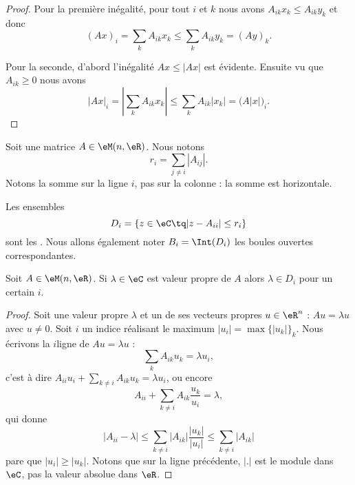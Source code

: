 \begin{proof}
    Pour la première inégalité, pour tout \( i\) et \( k\) nous avons \( A_{ik}x_k\leq A_{ik}y_k\) et donc
    \begin{equation}
        (Ax)_i=\sum_kA_{ik}x_k\leq \sum_kA_{ik}y_k=(Ay)_k.
    \end{equation}
    
    Pour la seconde, d'abord l'inégalité \( Ax\leq | Ax |\) est évidente. Ensuite vu que \( A_{ik}\geq 0\) nous avons
    \begin{equation}
        | Ax |_i=| \sum_kA_{ik}x_k |\leq \sum_kA_{ik}| x_k |=\big( A| x | \big)_i.
    \end{equation}
\end{proof}

Soit une matrice \( A\in\eM(n,\eR)\). Nous notons
\begin{equation}
    r_i=\sum_{j\neq i}| A_{ij} |.
\end{equation}
Notons la somme sur la ligne \( i\), pas sur la colonne : la somme est horizontale. 
\begin{definition}
    Les ensembles
    \begin{equation}
        D_i=\{ z\in \eC\tq | z-A_{ii} |\leq r_i \}
    \end{equation}
    sont les . Nous allons également noter \( B_i=\Int(D_i)\) les boules ouvertes correspondantes.
\end{definition}

\begin{theorem}[Gershgorin]     \label{THOooUJNFooHpvCCF}
    Soit \( A\in \eM(n,\eR)\). Si \( \lambda\in \eC\) est valeur propre de \( A\) alors \(   \lambda\in D_i   \) pour un certain \( i\).
\end{theorem}

\begin{proof}
    Soit une valeur propre \( \lambda\) et un de ses vecteurs propres \( u\in \eR^n\) : \( Au=\lambda u\) avec \( u\neq 0\). Soit \( i\) un indice réalisant le maximum \( | u_i |=\max\{ | u_k | \}_k\). Nous écrivons la \( i\)\ieme ligne de \( Au=\lambda u\) :
    \begin{equation}
        \sum_kA_{ik}u_k=\lambda u_i,
    \end{equation}
    c'est à dire \( A_{ii}u_i+\sum_{k\neq i}A_{ik}u_k=\lambda u_i\), ou encore
    \begin{equation}
        A_{ii}+\sum_{k\neq i}A_{ik}\frac{ u_k }{ u_i }=\lambda,
    \end{equation}
    qui donne
    \begin{equation}
        | A_{ii} -\lambda|\leq \sum_{k\neq i}| A_{ik} |\frac{ | u_k | }{ | u_i | }\leq \sum_{k\neq i}| A_{ik} |
    \end{equation}
    pare que \( | u_i |\geq | u_k |\). Notons que sur la ligne précédente, \( | . |\) est le module dans \( \eC\), pas la valeur absolue dans \( \eR\).
\end{proof}

